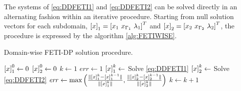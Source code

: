 %
The systems of \eqref{eq:DDFETI1} and \eqref{eq:DDFETI2} can be solved directly in an alternating fashion within an iterative procedure. Starting from null solution vectors for each subdomain, $\mat{x}_1 = \mat{x_1 \ x_{\Gamma_1} \ \lambda_1}^T$ and $\left[x\right]_2 = \left[x_2 \ x_{\Gamma_2} \ \lambda_2\right]^T$, the procedure is expressed by the algorithm \ref{alg:FETIWISE}.
\begin{algorithm}[ht!]
\begin{algorithmic}
\caption{Domain-wise FETI-DP solution procedure.}
\label{alg:FETIWISE}
\State $\left[x\right]_1^0 \gets 0$
\State $\left[x\right]_2^0 \gets 0$
\State $k \gets 1$
\State $\mathit{err} \gets 1$
    \State $\left[x\right]_1^k \gets$ Solve \eqref{eq:DDFETI1}
    \State $\left[x\right]_2^k \gets$ Solve \eqref{eq:DDFETI2}
    \State $\mathit{err} \gets \max \left(\frac{\Vert \left[x\right]_1^k - \left[x\right]_1^{k-1} \Vert}{\Vert \left[x\right]_1^k\Vert}, \frac{\Vert \left[x\right]_2^k - \left[x\right]_2^{k-1} \Vert}{\Vert \left[x\right]_2^k\Vert}\right)$ 
    \State $k \gets k+1$
\EndWhile
\end{algorithmic}
\end{algorithm}

